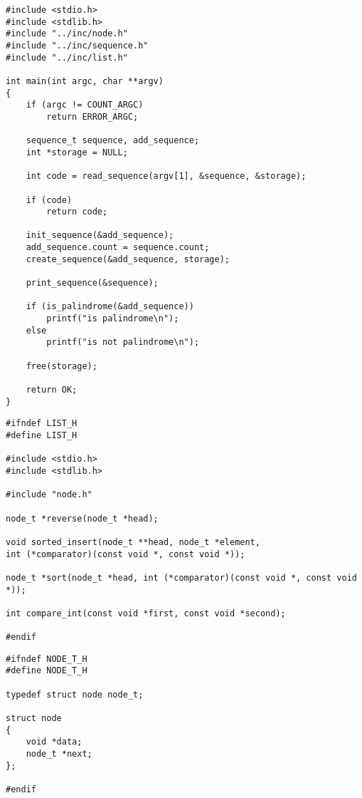 \begin{center}
    \captionsetup{justification=raggedright,singlelinecheck=off}
    \begin{lstlisting}[label=lst:main,caption=main.c]
#include <stdio.h>
#include <stdlib.h>
#include "../inc/node.h"
#include "../inc/sequence.h"
#include "../inc/list.h"

int main(int argc, char **argv)
{
    if (argc != COUNT_ARGC)
        return ERROR_ARGC;

    sequence_t sequence, add_sequence;
    int *storage = NULL;

    int code = read_sequence(argv[1], &sequence, &storage);

    if (code)
        return code;

    init_sequence(&add_sequence);
    add_sequence.count = sequence.count;
    create_sequence(&add_sequence, storage);

    print_sequence(&sequence);

    if (is_palindrome(&add_sequence))
        printf("is palindrome\n");
    else
        printf("is not palindrome\n");

    free(storage);

    return OK;
}
\end{lstlisting}
\end{center}

\clearpage

\begin{center}
    \captionsetup{justification=raggedright,singlelinecheck=off}
    \begin{lstlisting}[label=lst:list,caption=list.h]
#ifndef LIST_H
#define LIST_H

#include <stdio.h>
#include <stdlib.h>

#include "node.h"

node_t *reverse(node_t *head);

void sorted_insert(node_t **head, node_t *element,
int (*comparator)(const void *, const void *));

node_t *sort(node_t *head, int (*comparator)(const void *, const void *));

int compare_int(const void *first, const void *second);

#endif
\end{lstlisting}
\end{center}

\begin{center}
    \captionsetup{justification=raggedright,singlelinecheck=off}
    \begin{lstlisting}[label=lst:nodet,caption=node\_t.h]
#ifndef NODE_T_H
#define NODE_T_H

typedef struct node node_t;

struct node
{
    void *data;
    node_t *next;
};

#endif
\end{lstlisting}
\end{center}

